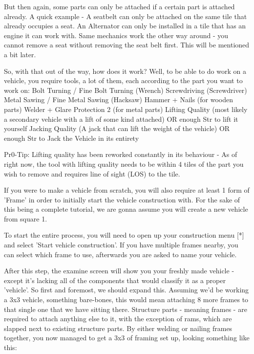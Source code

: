 \documentclass[11pt]{report}
\begin{document}
But then again, some parts can only be attached if a certain part is attached already. A quick example - A seatbelt can only be attached on the same tile that already occupies a seat. An Alternator can only be installed in a tile that has an engine it can work with. Same mechanics work the other way around - you cannot remove a seat without removing the seat belt first. This will be mentioned a bit later.

So, with that out of the way, how does it work? Well, to be able to do work on a vehicle, you require tools, a lot of them, each according to the part you want to work on:
Bolt Turning / Fine Bolt Turning (Wrench)
Screwdriving (Screwdriver)
Metal Sawing / Fine Metal Sawing (Hacksaw)
Hammer + Nails (for wooden parts)
Welder + Glare Protection 2 (for metal parts)
Lifting Quality (most likely a secondary vehicle with a lift of some kind attached) OR enough Str to lift it yourself
Jacking Quality (A jack that can lift the weight of the vehicle) OR enough Str to Jack the Vehicle in its entirety

Pr0-Tip: Lifting quality has been reworked constantly in its behaviour - As of right now, the tool with lifting quality needs to be within 4 tiles of the part you wish to remove and requires line of sight (LOS) to the tile.

If you were to make a vehicle from scratch, you will also require at least 1 form of 'Frame' in order to initially start the vehicle construction with. For the sake of this being a complete tutorial, we are gonna assume you will create a new vehicle from square 1.

To start the entire process, you will need to open up your construction menu [*] and select 'Start vehicle construction'. If you have multiple frames nearby, you can select which frame to use, afterwards you are asked to name your vehicle.

After this step, the examine screen will show you your freshly made vehicle - except it's lacking all of the components that would classify it as a proper 'vehicle'. So first and foremost, we should expand this. Assuming we'd be working a 3x3 vehicle, something bare-bones, this would mean attaching 8 more frames to that single one that we have sitting there. Structure parts - meaning frames - are required to attach anything else to it, with the exception of rams, which are slapped next to existing structure parts. By either welding or nailing frames together, you now managed to get a 3x3 of framing set up, looking something like this:
\end{document}
